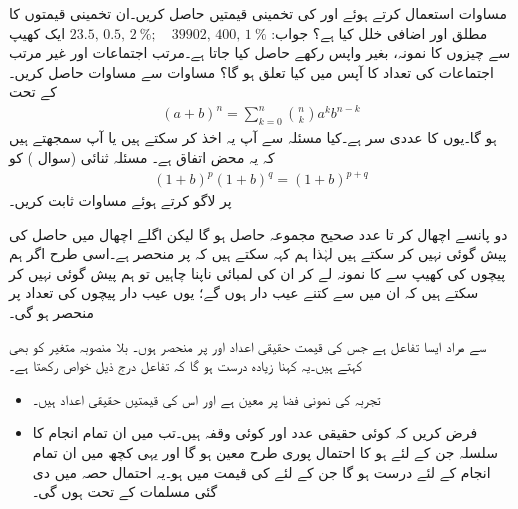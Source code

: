 \quad
مساوات  استعمال کرتے ہوئے  اور  کی تخمینی قیمتیں حاصل کریں۔ان تخمینی قیمتوں کا مطلق اور اضافی خلل کیا ہے؟
جواب:\quad
$23.5,\,0.5,\,\SI{2}{\percent};\quad \num{39902},\,400,\,\SI{1}{\percent}$
\quad
ایک کھیپ سے  چیزوں کا نمونہ، بغیر واپس رکھے حاصل کیا جاتا ہے۔مرتب اجتماعات اور غیر مرتب اجتماعات کی تعداد کا آپس میں کیا تعلق ہو گا؟
\quad
مساوات  سے مساوات  حاصل کریں۔
\quad {} \quad
{} کے تحت
\begin{align*}
(a+b)^n=\sum_{k=0}^{n}\binom{n}{k}a^kb^{n-k}
\end{align*}
ہو گا۔یوں  کا عددی سر  ہے۔کیا مسئلہ  سے آپ یہ اخذ کر سکتے ہیں یا آپ سمجھتے ہیں کہ یہ محض اتفاق ہے۔
\quad
مسئلہ ثنائی (سوال ) کو
\begin{align*}
(1+b)^p(1+b)^q=(1+b)^{p+q}
\end{align*}
پر لاگو کرتے ہوئے مساوات  ثابت کریں۔

دو پانسے اچھال کر  تا  عدد صحیح مجموعہ   حاصل ہو گا لیکن اگلے اچھال  میں حاصل   کی پیش گوئی نہیں کر سکتے ہیں لہٰذا ہم کہہ سکتے ہیں کہ   پر منحصر ہے۔اسی طرح اگر ہم پیچوں کی کھیپ سے  کا نمونہ لے کر ان کی لمبائی ناپنا چاہیں تو ہم پیش گوئی نہیں کر سکتے ہیں کہ ان میں سے کتنے عیب دار ہوں گے؛ یوں عیب دار پیچوں کی تعداد   پر منحصر ہو گی۔

   سے مراد ایسا تفاعل ہے جس کی قیمت حقیقی اعداد اور   پر منحصر ہوں۔ بلا منصوبہ متغیر کو  بھی کہتے ہیں۔یہ کہنا زیادہ درست ہو گا کہ تفاعل  درج ذیل خواص رکھتا ہے۔
\begin{itemize}
\item
تجربہ کی نمونی فضا  پر  معین ہے اور اس کی قیمتیں حقیقی اعداد ہیں۔
\item
فرض کریں کہ  کوئی حقیقی عدد اور  کوئی وقفہ ہیں۔تب  میں ان تمام انجام کا سلسلہ جن کے لئے  ہو کا احتمال پوری طرح معین ہو گا اور یہی کچھ  میں ان تمام انجام کے لئے درست ہو گا جن کے لئے  کی قیمت  میں ہو۔یہ احتمال حصہ  میں دی گئی مسلمات کے تحت ہوں گی۔
\end{itemize}

